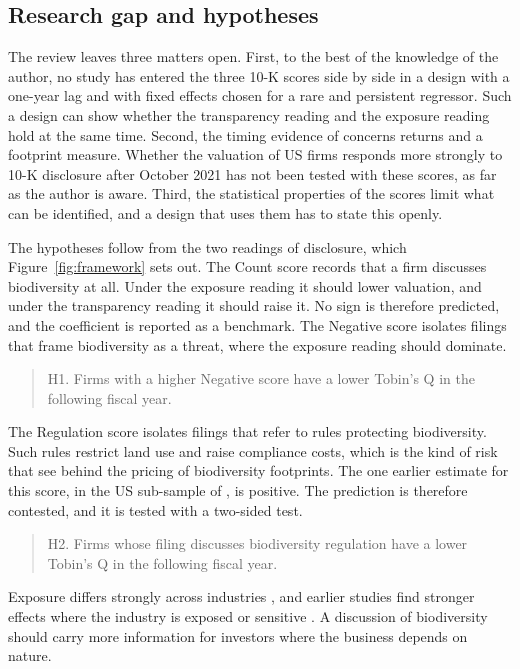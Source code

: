 \documentclass[12pt,a4paper]{article}
\begin{document}
\subsection{Research gap and hypotheses}

\enlargethispage{\baselineskip}%
The review leaves three matters open. First, to the best of the knowledge of the author, no study has entered the three 10-K scores side by side in a design with a one-year lag and with fixed effects chosen for a rare and persistent regressor. Such a design can show whether the transparency reading and the exposure reading hold at the same time. Second, the timing evidence of \citet{garel2024} concerns returns and a footprint measure. Whether the valuation of US firms responds more strongly to 10-K disclosure after October 2021 has not been tested with these scores, as far as the author is aware. Third, the statistical properties of the scores limit what can be identified, and a design that uses them has to state this openly.

The hypotheses follow from the two readings of disclosure, which Figure~\ref{fig:framework} sets out. The Count score records that a firm discusses biodiversity at all. Under the exposure reading it should lower valuation, and under the transparency reading it should raise it. No sign is therefore predicted, and the coefficient is reported as a benchmark. The Negative score isolates filings that frame biodiversity as a threat, where the exposure reading should dominate.

\begin{quote}
H1. Firms with a higher Negative score have a lower Tobin's Q in the following fiscal year.
\end{quote}

The Regulation score isolates filings that refer to rules protecting biodiversity. Such rules restrict land use and raise compliance costs, which is the kind of risk that \citet{garel2024} see behind the pricing of biodiversity footprints. The one earlier estimate for this score, in the US sub-sample of \citet{cosma2025}, is positive. The prediction is therefore contested, and it is tested with a two-sided test.

\begin{quote}
H2. Firms whose filing discusses biodiversity regulation have a lower Tobin's Q in the following fiscal year.
\end{quote}

Exposure differs strongly across industries \citep{giglio2026}, and earlier studies find stronger effects where the industry is exposed or sensitive \citep{ahmad2024,bach2025}. A discussion of biodiversity should carry more information for investors where the business depends on nature.
\end{document}
